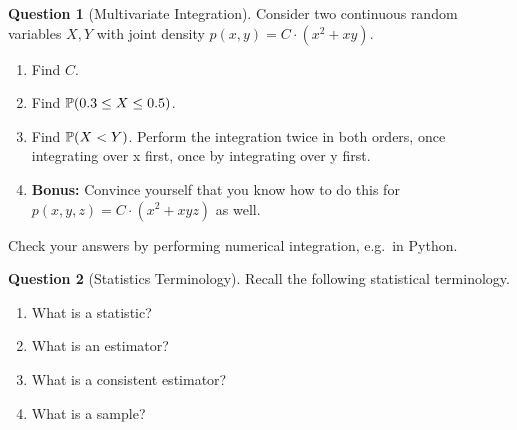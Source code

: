 \documentclass[a4paper]{article}
\theoremstyle{definition}
\newtheorem{question}{Question}
\begin{document}
\begin{question}[Multivariate Integration]
Consider two continuous random variables $X,Y$ with joint density $p(x, y) = C\cdot (x^2 + xy)$.
\begin{enumerate}[label=\alph*.]
    \item Find $C$.
    \item Find $\prob{0.3 \leq X \leq 0.5}$.
    \item Find $\prob{X < Y}$. Perform the integration twice in both orders, once integrating over x first, once by integrating over y first.
    \item \textbf{Bonus:} Convince yourself that you know how to do this for $p(x, y, z) = C\cdot (x^2 + xyz)$ as well.
\end{enumerate}
Check your answers by performing numerical integration, e.g.~in Python.
\end{question}

\begin{question}[Statistics Terminology] Recall the following statistical terminology.
\label{q:stats-term}
\begin{enumerate}[label=\alph*.]
    \item What is a statistic?
    \item What is an estimator?
    \item What is a consistent estimator?
    \item What is a sample?
\end{enumerate}
\end{question}























\printbibliography
\end{document}
